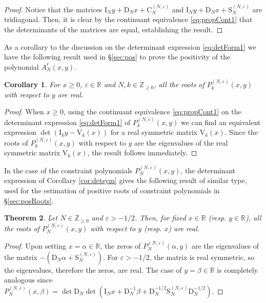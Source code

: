\documentclass[11pt]{article}
\numberwithin{equation}{section}
\newcommand{\Z}{\mathbb{Z}} %
\newcommand{\R}{\mathbb{R}} %
\newcommand{\e}{\varepsilon}
\newcommand{\cp}[2]{P^{(#1)}_{#2}} %
\newcommand{\MatSymbol}[1]{\bm{\mathrm{#1}}}
\newcommand{\mC}{\MatSymbol{C}}
\newcommand{\mD}{\MatSymbol{D}}
\newcommand{\mI}{\MatSymbol{I}}
\newcommand{\mS}{\MatSymbol{S}}
\newcommand{\mV}{\MatSymbol{V}}
\theoremstyle{plain}
\newtheorem{thm}{Theorem}[section]
\newtheorem{cor}[thm]{Corollary}
\theoremstyle{definition}
\theoremstyle{remark}
\begin{document}
\begin{proof}
  Notice that the matrices \(\mI_N y + \mD_N x + \mC^{(N,\e)}_N\) and
  \(\mI_N y + \mD_N x + \mS_N^{(N,\e)} \) are tridiagonal. Then,
  it is clear by the continuant equivalence \eqref{eq:propCont1} that the determinants of the matrices are equal, establishing
  the result. 
\end{proof}

As a corollary to the discussion on the determinant expression \eqref{eq:detForm1}
we have the following result used in \S \ref{sec:pos} to prove the positivity of the
polynomial \(A_N^{\ell}(x,y)\).

\begin{cor}
  \label{cor:realrootsposx}
  For \(x \geq 0\), \(\e \in \R \) and \(N,k \in \Z_{\geq 0}\), all the roots of \(\cp{N,\e}{k}(x,y) \) with respect to \(y\)
  are real.
\end{cor}

\begin{proof}
  When \(x \geq 0\), using the continuant equivalence \eqref{eq:propCont1} on
  the determinant expression \eqref{eq:detForm1} of \(\cp{N,\e}{k}(x,y) \) we can find an equivalent expression
  \( \det( \mI_k y - \mV_k(x)) \) for a real symmetric matrix \(\mV_k(x)\). Since the roots of
  \(\cp{N,\e}{k}(x,y) \) with respect to \(y\) are the eigenvalues of the real symmetric matrix \(\mV_k(x) \),
  the result follows immediately. 
\end{proof}

In the case of the constraint polynomials \(\cp{N,\e}{N}(x,y)\), the determinant
expression of Corollary \ref{cor:detsym} gives the following result of similar
type, used for the estimation of positive roots of constraint
polynomials in \S \ref{sec:posRoots}.

\begin{thm}
  \label{thm:allrealroots}
  Let \( N \in \Z_{\geq 0}\) and \(\e > -1/2 \). Then, for fixed \(x \in \R\) (resp. \(y \in \R\)),
  all the roots of \(\cp{N,\e}{N}(x,y) \) with respect to \(y\) (resp. \(x\))
  are real.
\end{thm}

\begin{proof}
  Upon setting \(x = \alpha \in \R\), the zeros of \(\cp{N,\e}{N}(\alpha,y)\) are the
  eigenvalues of the matrix \(-(\mD_N \alpha + \mS^{(N,\e)}_N )\).
  For \(\e > -1/2 \), the matrix is real symmetric, so the eigenvalues,
  therefore the zeros, are real.
  The case of \(y = \beta \in \R \) is completely analogous
  since $\cp{N,\e}{N}(x,\beta)=\det\mD_N\det(\mI_N x +\mD_N^{-1}\beta +\mD_N^{-1/2}\mS_N^{(N,\e)}\mD_N^{-1/2})$. 
\end{proof}
\end{document}
